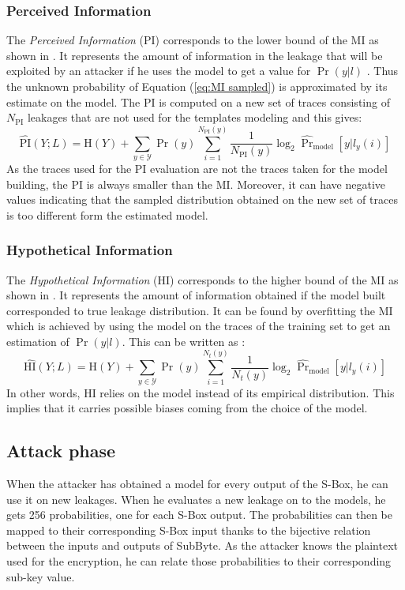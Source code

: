 \subsubsection{Perceived Information}
The \textit{Perceived Information} (PI) corresponds to the lower bound of 
the MI as shown in \cite{boundPIHI}. It represents the amount of 
information in the leakage that will be exploited by an attacker if he 
uses the model to get a value for $\Pr(y|l)$ \cite{leakage_of_chip}. Thus 
the unknown probability of Equation (\ref{eq:MI sampled}) is approximated 
by its estimate on the model. The PI is computed on a new set of traces 
consisting of $N_{\text{PI}}$ leakages that are not used for the templates 
modeling and this gives:
\begin{equation*}
     \hat{\text{PI}}(Y;L) = \text{H}(Y) + 
\sum_{y\in\mathcal{Y}}\Pr(y)\sum_{i=1}^{N_{\text{PI}}(y)} 
\frac{1}{N_{\text{PI}}(y)}\log_2\hat{\Pr}_{\text{model}}[y|l_y(i)]
\end{equation*}
As the traces used for the PI evaluation are not the traces taken for the 
model building, the PI is always smaller than the MI. Moreover, it can 
have negative values indicating that the sampled distribution obtained on 
the new set of traces is too different form the estimated model.
\subsubsection{Hypothetical Information}
The \textit{Hypothetical Information} (HI) corresponds to the higher bound 
of the MI as shown in \cite{boundPIHI}. It represents the amount of 
information obtained if the model built corresponded to true leakage 
distribution. It can be found by overfitting the MI which is achieved by 
using the model on the traces of the training set to get an estimation of 
$\Pr(y|l)$. This can be written as :
\begin{equation*}
    \hat{\text{HI}}(Y;L) = \text{H}(Y) + 
\sum_{y\in\mathcal{Y}}\Pr(y)\sum_{i=1}^{N_t(y)}\frac{1}{N_t(y)}\log_2\hat{\Pr}_\text{model}[y|l_y(i)]
\end{equation*}
In other words, HI relies on the model instead of its empirical 
distribution. This implies that it carries possible biases coming from the 
choice of the model. 
\subsection{Attack phase}\label{sec:Attack phase}
When the attacker has obtained a model for every output of the S-Box, he 
can use it on new leakages. When he evaluates a new leakage on to the 
models, he gets 256 probabilities, one for each S-Box output. The 
probabilities can then be mapped to their corresponding S-Box input thanks 
to the bijective relation between the inputs and outputs of SubByte. As 
the attacker knows the plaintext used for the encryption, he can relate 
those probabilities to their corresponding sub-key value. \\

